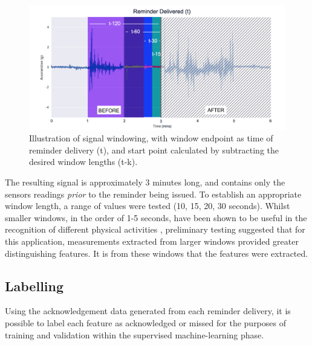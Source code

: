 \begin{figure}[h]
    \centering
        \includegraphics[scale=0.35, angle=0]{Files/treatment-study-1/figures/accelerometer-full-windowed}
        \caption{Illustration of signal windowing, with window endpoint as time of reminder delivery (t), and start point calculated by subtracting the desired window lengths (t-k).}
        \label{fig: accelerometer-full-windowed}
\end{figure}

The resulting signal is approximately 3 minutes long, and contains only the sensors readings \textit{prior} to the reminder being issued.
To establish an appropriate window length, a range of values were tested (10, 15, 20, 30 seconds). Whilst smaller windows, in the order of 1-5 seconds, have been shown to be useful in the recognition of different physical activities \cite{Wagenaar2011, Khan2014}, preliminary testing suggested that for this application, measurements extracted from larger windows provided greater distinguishing features. It is from these windows that the features were extracted.

\subsection{Labelling}
Using the acknowledgement data generated from each reminder delivery, it is possible to label each feature as acknowledged or missed for the purposes of training and validation within the supervised machine-learning phase.

